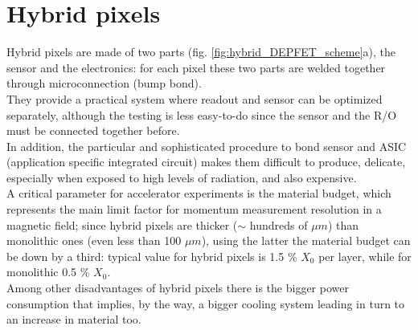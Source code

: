 \section{Hybrid pixels}
   Hybrid pixels are made of two parts (fig. \ref{fig:hybrid_DEPFET_scheme}a), the sensor and the electronics: for each pixel these two parts are welded together through microconnection (bump bond).\\  
   They provide a practical system where readout and sensor can be optimized separately, although the testing is less easy-to-do since the sensor and the R/O must be connected together before.\\
   In addition, the particular and sophisticated procedure to bond sensor and ASIC (application specific integrated circuit) makes them difficult to produce, delicate, especially when exposed to high levels of radiation, and also expensive. \\
   A critical parameter for accelerator experiments is the material budget, which represents the main limit factor for momentum measurement resolution in a magnetic field; since hybrid pixels are thicker ($\sim$ hundreds of $\mu m$) than monolithic ones (even less than 100 $\mu m$), using the latter the material budget can be down by a third: typical value for hybrid pixels is 1.5 \% $X_0$ per layer, while for monolithic 0.5 \% $X_0$.\\
   Among other disadvantages of hybrid pixels there is the bigger power consumption that implies, by the way, a bigger cooling system leading in turn to an increase in material too.\\

